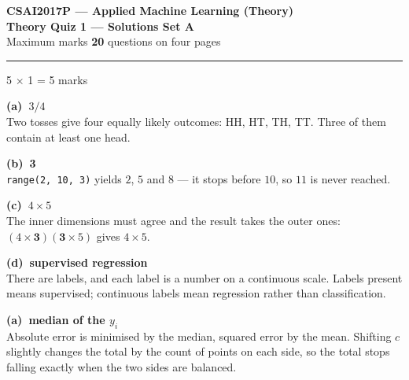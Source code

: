 \documentclass[10pt,a4paper]{article}
\newcommand{\SetLetter}{}
\newcommand{\parthead}[2]{\vspace{2pt}\noindent\rule{\linewidth}{0.4pt}\par\vspace{2pt}%
  \noindent{\bfseries Part #1}\hfill{\small #2}\par\vspace{1pt}}
\newcommand{\sol}[1]{\textbf{#1}}
\begin{document}
\renewcommand{\SetLetter}{A}\setcounter{page}{1}

\begin{center}
{\large\bfseries CSAI2017P --- Applied Machine Learning (Theory)}\\[2pt]
{\large\bfseries Theory Quiz 1 --- Solutions \quad\textbullet\quad Set A}\\[3pt]
{\small Maximum marks \textbf{20} \quad\textbullet{} questions on four pages}
\end{center}
\vspace{2pt}

\noindent{}
\vspace{3pt}


\parthead{A --- Multiple choice}{5 $\times$ 1 = 5 marks}

\begin{sA}

  \item \sol{(a)\ $3/4$}\\ Two tosses give four equally likely outcomes: HH, HT, TH, TT. Three of them contain at least one head.

  \item \sol{(b)\ 3}\\ \texttt{range(2, 10, 3)} yields $2$, $5$ and $8$ --- it stops before $10$, so $11$ is never reached.

  \item \sol{(c)\ $4 \times 5$}\\ The inner dimensions must agree and the result takes the outer ones: $(4 \times \mathbf{3})(\mathbf{3} \times 5)$ gives $4 \times 5$.

  \item \sol{(d)\ supervised regression}\\ There are labels, and each label is a number on a continuous scale. Labels present means supervised; continuous labels mean regression rather than classification.

  \item \sol{(a)\ median of the $y_i$}\\ Absolute error is minimised by the median, squared error by the mean. Shifting $c$ slightly changes the total by the count of points on each side, so the total stops falling exactly when the two sides are balanced.

\end{sA}
\end{document}
